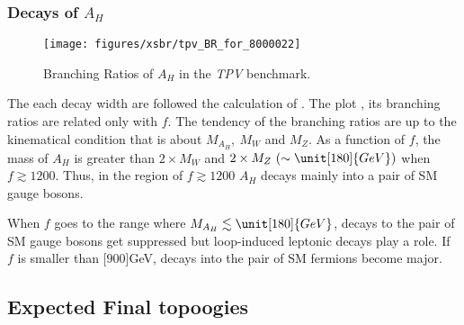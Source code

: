 \subsubsection*{Decays of $A_H$}
\begin{figure}
\centering
\texttt{[image: figures/xsbr/tpv\_BR\_for\_8000022]}
\caption{Branching Ratios of $A_H$ in the \emph{TPV} benchmark.}
\label{fig:cm:br22}
\end{figure}

The each decay width are followed the calculation of . 
The plot , its branching ratios are related only with $f$. 
The tendency of the branching ratios are up to the kinematical condition that is about $M_{A_H},~M_W$ and $M_Z$.
As a function of $f$, the mass of $A_H$ is greater than $2\times M_W$ and $2\times M_Z~(\sim \unit[180]{GeV})$ when $f \gtrsim 1200$.
Thus, in the region of $f \gtrsim 1200$ $A_H$ decays mainly into a pair of SM gauge bosons. 

When $f$ goes to the range where $M_{A_H} \lesssim \unit[180]{GeV}$, decays to the pair of SM gauge bosons get suppressed 
but loop-induced leptonic decays play a role. 
If $f$ is smaller than \unit[$900$]{GeV}, decays into the pair of SM fermions become major. 

\subsection{Expected Final topoogies}

